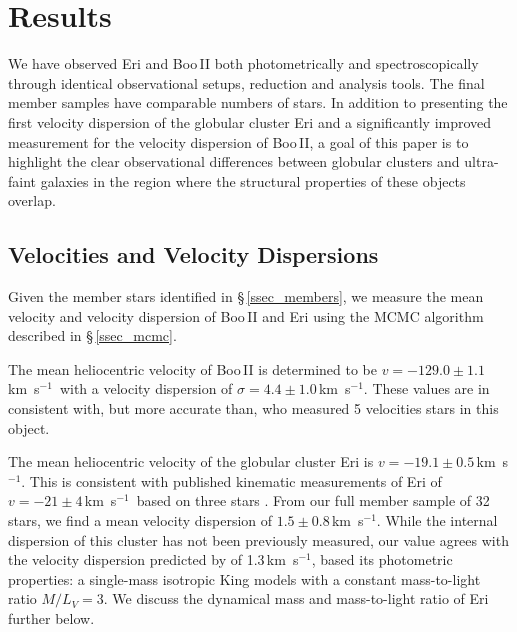 \documentclass{../tex_files/emulateapj}
\newcommand{\kms}{\,km~s$^{-1}$}
\begin{document}
\section{Results} \label{sec_results}

We have observed Eri and Boo\,II both photometrically and
spectroscopically through identical observational
setups, reduction and analysis tools.  The final member samples have comparable numbers
of stars.  In addition to presenting the first velocity dispersion of
the globular cluster Eri and a significantly improved measurement for
the velocity dispersion of Boo\,II, a goal of this paper is to
highlight the clear observational differences between globular
clusters and ultra-faint galaxies in the region where the structural
properties of these objects overlap.  





\subsection{Velocities and Velocity Dispersions}\label{ssec_vdisp}

Given the member stars identified in \S\,\ref{ssec_members}, we
measure the mean velocity and velocity dispersion of Boo\,II and Eri
using the MCMC algorithm described in \S\,\ref{ssec_mcmc}.  

The mean heliocentric velocity of Boo\,II is determined to be $v =
-129.0 \pm 1.1$\kms\ with a velocity dispersion of $\sigma = 4.4\pm
1.0$\kms.  These values are in consistent with, but more accurate
than, \citet{koch08a} who measured 5 velocities stars in this object.

The mean heliocentric velocity of the globular cluster Eri is
$v = -19.1\pm0.5$\kms.  This is consistent with published kinematic
measurements of Eri of $v = -21 \pm 4$\kms\ based on three stars
\citep{zaritsky89a}.  From our full member sample of 32 stars, we find
a mean velocity dispersion of $1.5\pm0.8$\kms.  While the internal
dispersion of this cluster has not been previously measured, our value
agrees with the velocity dispersion predicted by \citet{gnedin02a} of
1.3\kms, based its photometric properties: a single-mass isotropic
King models with a constant mass-to-light ratio $M/L_V = 3$.  We
discuss the dynamical mass and mass-to-light ratio of Eri further
below.
\end{document}
